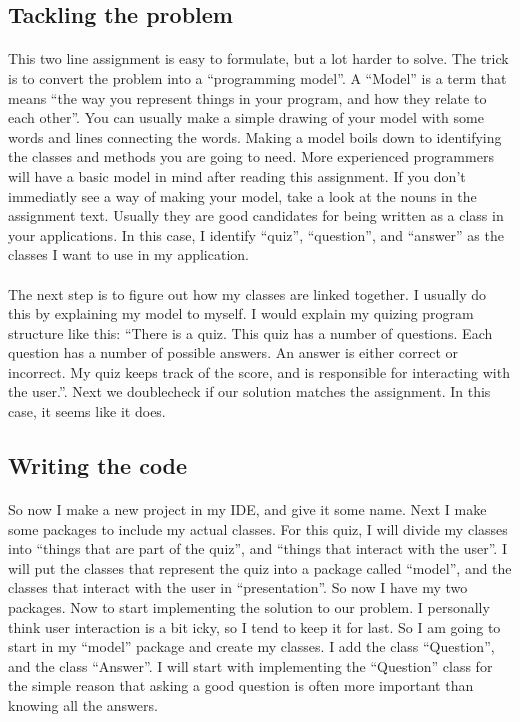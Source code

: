 \documentclass[11pt,fleqn]{book} %
\begin{document}
\subsection{Tackling the problem}
\paragraph{}This two line assignment is easy to formulate, but a lot harder to solve. The trick is to convert the problem into a ``programming model''. A ``Model'' is a term that means ``the way you represent things in your program, and how they relate to each other''. You can usually make a simple drawing of your model with some words and lines connecting the words. 
Making a model boils down to identifying the classes and methods you are going to need. More experienced programmers will have a basic model in mind after reading this assignment.
If you don't immediatly see a way of making your model, take a look at the nouns in the assignment text. Usually they are good candidates for being written as a class in your applications.
In this case, I identify ``quiz'', ``question'', and ``answer'' as the classes I want to use in my application.

\paragraph{} The next step is to figure out how my classes are linked together. I usually do this by explaining my model to myself. I would explain my quizing program structure like this:
``There is a quiz. This quiz has a number of questions. Each question has a number of possible answers. An answer is either correct or incorrect. My quiz keeps track of the score, and is responsible for interacting with the user.''. Next we doublecheck if our solution matches the assignment. In this case, it seems like it does.

\subsection{Writing the code}
\paragraph{}So now I make a new project in my IDE, and give it some name. Next I make some packages to include my actual classes. For this quiz, I will divide my classes into ``things that are part of the quiz'', and ``things that interact with the user''. I will put the classes that represent the quiz into a package called ``model'', and the classes that interact with the user in ``presentation''. So now I have my two packages. Now to start implementing the solution to our problem. I personally think user interaction is a bit icky, so I tend to keep it for last. So I am going to start in my ``model'' package and create my classes. I add the class ``Question'', and the class ``Answer''. I will start with implementing the ``Question'' class for the simple reason that asking a good question is often more important than knowing all the answers. 
\end{document}
